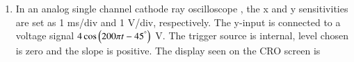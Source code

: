 \documentclass[journal,12pt,onecolumn]{IEEEtran}
\theoremstyle{remark}
\begin{document}
\begin{enumerate}
\item In an analog single channel cathode ray oscilloscope , the x and y sensitivities are set as 1 ms/div and 1 V/div, respectively. The y-input is connected to a voltage signal $4 \cos\left(200\pi t - 45^\degree\right)$ V. The trigger source is internal, level chosen is zero and the slope is positive. The display seen on the CRO screen is
\begin{enumerate}
\begin{figure}[H]
\centering
{}
\end{figure}
\end{enumerate}
\end{enumerate}
\end{document}
